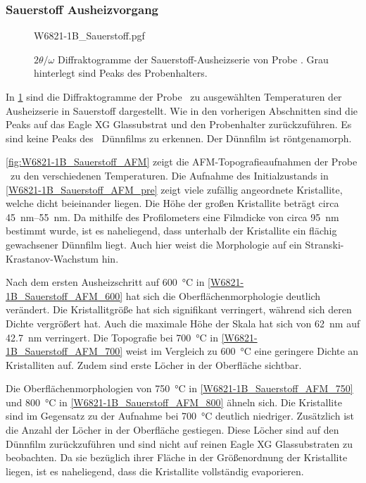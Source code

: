 \subsubsection{Sauerstoff Ausheizvorgang}\label{subsubsec:W6821-1B_Sauerstoff}
\begin{figure}
    \centering
    {W6821-1B_Sauerstoff.pgf}
    \caption{$2\theta/\omega$ Diffraktogramme der Sauerstoff-Ausheizserie von Probe \sampleone.
    Grau hinterlegt sind Peaks des Probenhalters.}
    \label{fig:W6821-1B_Sauerstoff_XRD}
\end{figure}
In \cref{fig:W6821-1B_Sauerstoff_XRD} sind die Diffraktogramme der Probe \sampleone\ zu ausgewählten
Temperaturen der Ausheizserie in Sauerstoff dargestellt.
Wie in den vorherigen Abschnitten sind die Peaks auf das Eagle XG Glassubstrat und den Probenhalter zurückzuführen.
Es sind keine Peaks des \heo\ Dünnfilms zu erkennen.
Der Dünnfilm ist röntgenamorph.

\cref{fig:W6821-1B_Sauerstoff_AFM} zeigt die AFM-Topografieaufnahmen der Probe \sampleone\ zu den verschiedenen
Temperaturen.
Die Aufnahme des Initialzustands in \cref{W6821-1B_Sauerstoff_AFM_pre} zeigt viele zufällig angeordnete Kristallite,
welche dicht beieinander liegen.
Die Höhe der großen Kristallite beträgt circa \qtyrange{45}{55}{\nano\meter}.
Da mithilfe des Profilometers eine Filmdicke von circa \qty{95}{\nano\meter} bestimmt wurde, ist es naheliegend,
dass unterhalb der Kristallite ein flächig gewachsener Dünnfilm liegt.
Auch hier weist die Morphologie auf ein Stranski-Krastanov-Wachstum hin.

Nach dem ersten Ausheizschritt auf \qty{600}{\degreeCelsius} in \cref{W6821-1B_Sauerstoff_AFM_600} hat sich die
Oberflächenmorphologie deutlich verändert.
Die Kristallitgröße hat sich signifikant verringert, während sich deren Dichte vergrößert hat.
Auch die maximale Höhe der Skala hat sich von \qty{62}{\nano\meter} auf \qty{42.7}{\nano\meter} verringert.
Die Topografie bei \qty{700}{\degreeCelsius} in \cref{W6821-1B_Sauerstoff_AFM_700} weist im Vergleich zu
\qty{600}{\degreeCelsius} eine geringere Dichte an Kristalliten auf.
Zudem sind erste Löcher in der Oberfläche sichtbar.

Die Oberflächenmorphologien von \qty{750}{\degreeCelsius} in \cref{W6821-1B_Sauerstoff_AFM_750} und
\qty{800}{\degreeCelsius} in \cref{W6821-1B_Sauerstoff_AFM_800} ähneln sich.
Die Kristallite sind im Gegensatz zu der Aufnahme bei \qty{700}{\degreeCelsius} deutlich niedriger.
Zusätzlich ist die Anzahl der Löcher in der Oberfläche gestiegen.
Diese Löcher sind auf den Dünnfilm zurückzuführen und sind nicht auf reinen Eagle XG Glassubstraten zu beobachten.
Da sie bezüglich ihrer Fläche in der Größenordnung der Kristallite liegen, ist es naheliegend, dass die Kristallite
vollständig evaporieren.


